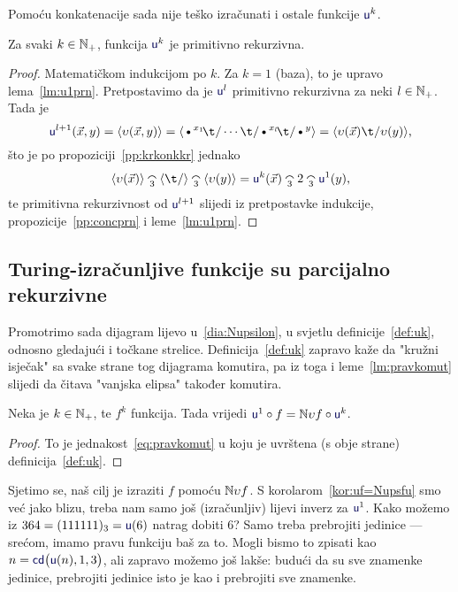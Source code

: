Pomoću konkatenacije sada nije teško izračunati i ostale funkcije $\f u^k$.

\begin{propozicija}\label{pp:ukprn}
Za svaki $k\in{\mathbb N}_+$, funkcija $\f u^k$ je primitivno rekurzivna.
\end{propozicija}
\begin{proof}
Matematičkom indukcijom po $k$. Za $k=1$ (baza), to je upravo lema~\ref{lm:u1prn}. Pretpostavimo da je $\f u^l$ primitivno rekurzivna za neki $l\in{\mathbb N}_+$. Tada je
\begin{equation}
    \f u^{l+1}(\vec x,y)=
    \kr{\upsilon(\vec x,y)}=
    \kr{\text\textbullet^{x_1}\!\t/\dotsm\t/\text\textbullet^{x_l}\!\t/\text\textbullet^y}=
    \kr{\upsilon(\vec x)\t/\upsilon(y)}\text,
\end{equation}
što je po propoziciji~\ref{pp:krkonkkr} jednako
\begin{equation}
    \kr{\upsilon(\vec x)}\conc 3\kr{\t/}\conc 3\kr{\upsilon(y)}=
    \f u^k(\vec x)\conc32\conc3\f u^1(y)\text,
\end{equation}
te primitivna rekurzivnost od $\f u^{l+1}$ slijedi iz pretpostavke indukcije, propozicije~\ref{pp:concprn} i leme~\ref{lm:u1prn}.
\end{proof}

\subsection{Turing-izračunljive funkcije su parcijalno rekurzivne}

Promotrimo sada dijagram lijevo u~\eqref{dia:Nupsilon}, u svjetlu definicije~\ref{def:uk}, odnosno gledajući i točkane strelice. Definicija~\ref{def:uk} zapravo kaže da "kružni isječak" sa svake strane tog dijagrama komutira, pa iz toga i leme~\ref{lm:pravkomut} slijedi da čitava "\!vanjska elipsa" također komutira.

\begin{korolar}\label{kor:uf=Nupsfu}
Neka je $k\in{\mathbb N}_+$, te $f^k$ funkcija. Tada vrijedi
    $\f u^1\circ f=\N\upsilon f\circ\f u^k$.
\end{korolar}
\begin{proof}
To je jednakost~\eqref{eq:pravkomut} u koju je uvrštena (s obje strane) definicija~\ref{def:uk}.
\end{proof}

Sjetimo se, naš cilj je izraziti $f$ pomoću ${\mathbb N}\upsilon f$. S korolarom~\ref{kor:uf=Nupsfu} smo već jako blizu, treba nam samo još (izračunljiv) lijevi inverz za $\f u^1$. Kako možemo iz $364=(111111)_3=\f u(6)$ natrag dobiti $6$? Samo treba prebrojiti jedinice --- srećom, imamo pravu funkciju baš za to. Mogli bismo to zpisati kao $n=\f{cd}\bigl(\f u(n),1,3\bigr)$, ali zapravo možemo još lakše: budući da su sve znamenke jedinice, prebrojiti jedinice isto je kao i prebrojiti sve znamenke.

